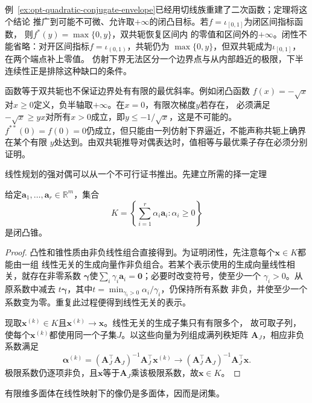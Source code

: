 例~\ref{ex:opt-quadratic-conjugate-envelope}已经用切线族重建了二次函数；定理将这个结论
推广到可能不可微、允许取$+\infty$的闭凸目标。若$f=\iota_{[0,1]}$为闭区间指标函数，
则$f^*(y)=\max\{0,y\}$，双共轭恢复区间内
的零值和区间外的$+\infty$。闭性不能省略：对开区间指标$f=\iota_{(0,1)}$，共轭仍为
$\max\{0,y\}$，但双共轭成为$\iota_{[0,1]}$，在两个端点补上零值。
仿射下界无法区分一个边界点与从内部趋近的极限，下半连续性正是排除这种缺口的条件。

函数等于双共轭也不保证边界处有有限的最优斜率。例如闭凸函数
$f(x)=-\sqrt{x}$对$x\geq0$定义，负半轴取$+\infty$。在$x=0$，有限次梯度$y$若存在，
必须满足$-\sqrt{x}\geq yx$对所有$x>0$成立，即$y\leq-1/\sqrt{x}$，这是不可能的。
$f^{**}(0)=f(0)=0$仍成立，但只能由一列仿射下界逼近，不能声称共轭上确界在某个有限
$y$处达到。由双共轭推导对偶表达时，值相等与最优乘子存在必须分别证明。

线性规划的强对偶可以从一个不可行证书推出。先建立所需的择一定理

\begin{lemma}[有限生成锥的闭性]
\label{lem:opt-finitely-generated-cone}
给定$\bm{a}_1,\ldots,\bm{a}_r\in\mathbb{R}^m$，集合
\[
  K=\left\{\sum_{i=1}^r\alpha_i\bm{a}_i:\alpha_i\geq0\right\}
\]
是闭凸锥。
\end{lemma}

\begin{proof}
凸性和锥性质由非负线性组合直接得到。为证明闭性，先注意每个$\bm{x}\in K$都能由一组
线性无关的生成向量作非负组合。若某个表示使用的生成向量线性相关，就存在非零系数
$\bm{\gamma}$使$\sum_i\gamma_i\bm{a}_i=\bm{0}$；必要时改变符号，使至少一个
$\gamma_i>0$。从原系数中减去
$t\bm{\gamma}$，其中$t=\min_{\gamma_i>0}\alpha_i/\gamma_i$，仍保持所有系数
非负，并使至少一个系数变为零。重复此过程便得到线性无关的表示。

现取$\bm{x}^{(k)}\in K$且$\bm{x}^{(k)}\to\bm{x}$。线性无关的生成子集只有有限多个，
故可取子列，使每个$\bm{x}^{(k)}$都使用同一个子集$J$。以这些向量为列组成满列秩矩阵
$\bm{A}_J$，相应非负系数满足
\[
  \bm{\alpha}^{(k)}
  =(\bm{A}_J^{\top}\bm{A}_J)^{-1}\bm{A}_J^{\top}\bm{x}^{(k)}
  \longrightarrow
  (\bm{A}_J^{\top}\bm{A}_J)^{-1}\bm{A}_J^{\top}\bm{x}.
\]
极限系数仍逐项非负，且$\bm{x}$等于$\bm{A}_J$乘该极限系数，故$\bm{x}\in K$。
\end{proof}

\begin{lemma}[有限维多面体的线性像]
\label{lem:opt-polyhedral-image}
有限维多面体在线性映射下的像仍是多面体，因而是闭集。
\end{lemma}

